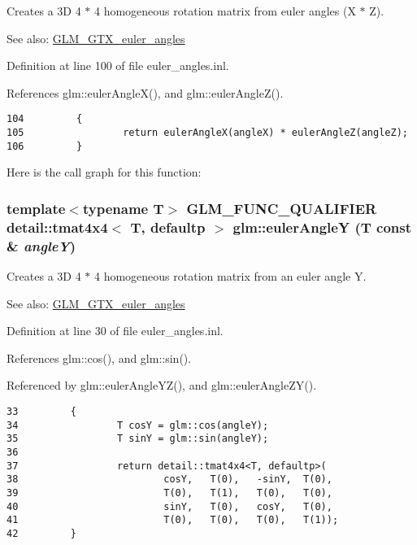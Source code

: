 Creates a 3D 4 $\ast$ 4 homogeneous rotation matrix from euler angles (X $\ast$ Z). \begin{Desc}
\item[See also:]\hyperlink{group__gtx__euler__angles}{GLM\_\-GTX\_\-euler\_\-angles} \end{Desc}


Definition at line 100 of file euler\_\-angles.inl.

References glm::eulerAngleX(), and glm::eulerAngleZ().

\begin{Code}\begin{verbatim}104         {
105                 return eulerAngleX(angleX) * eulerAngleZ(angleZ);
106         }
\end{verbatim}
\end{Code}




Here is the call graph for this function:\hypertarget{group__gtx__euler__angles_g558b0e0fd3c1f6a414d184a22c968b79}{
\subsubsection[eulerAngleY]{\setlength{\rightskip}{0pt plus 5cm}template$<$typename T$>$ GLM\_\-FUNC\_\-QUALIFIER detail::tmat4x4$<$ T, defaultp $>$ glm::eulerAngleY (T const \& {\em angleY})}}
\label{group__gtx__euler__angles_g558b0e0fd3c1f6a414d184a22c968b79}


Creates a 3D 4 $\ast$ 4 homogeneous rotation matrix from an euler angle Y. \begin{Desc}
\item[See also:]\hyperlink{group__gtx__euler__angles}{GLM\_\-GTX\_\-euler\_\-angles} \end{Desc}


Definition at line 30 of file euler\_\-angles.inl.

References glm::cos(), and glm::sin().

Referenced by glm::eulerAngleYZ(), and glm::eulerAngleZY().

\begin{Code}\begin{verbatim}33         {
34                 T cosY = glm::cos(angleY);
35                 T sinY = glm::sin(angleY);
36 
37                 return detail::tmat4x4<T, defaultp>(
38                         cosY,   T(0),   -sinY,  T(0),
39                         T(0),   T(1),   T(0),   T(0),
40                         sinY,   T(0),   cosY,   T(0),
41                         T(0),   T(0),   T(0),   T(1));
42         }
\end{verbatim}
\end{Code}




